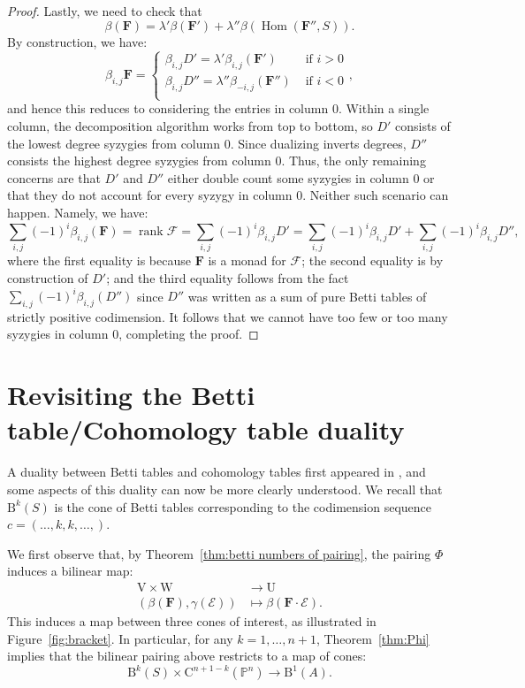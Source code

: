 \documentclass[12pt]{amsart}
\theoremstyle{definition}
\theoremstyle{remark}
\newcommand{\Hom}{\operatorname{Hom}} %
\newcommand{\rank}{\operatorname{rank}}
\newcommand{\PP}{\mathbb{P}}
\newcommand{\UU}{\mathrm{U}}
\newcommand{\VV}{\mathrm{V}}
\newcommand{\WW}{\mathrm{W}}
\newcommand{\bb}{c}
\newcommand{\cE}{\mathcal{E}}
\newcommand{\cF}{\mathcal{F}}
\newcommand{\FF}{\mathbf{F}}
\newcommand{\CQ}{\mathrm{C}}
\newcommand{\BBQ}{\mathrm{B}}
\begin{document}
\begin{proof}
Lastly, we need to check that
\[
\beta(\FF)=\lambda'\beta(\FF')+\lambda''\beta(\Hom(\FF'',S)).
\]
By construction, we have:
\[
\beta_{i,j}\FF=\begin{cases}
\beta_{i,j}D'=\lambda'\beta_{i,j}(\FF') &\text{ if } i>0\\
\beta_{i,j}D''=\lambda''\beta_{-i,j}(\FF'') &\text{ if } i<0\\
\end{cases},
\]
and hence this reduces to considering the entries in column $0$.  Within a single column, the decomposition algorithm works from top to bottom, so $D'$ consists of the lowest degree syzygies from column $0$.  Since dualizing inverts degrees, $D''$ consists the highest degree syzygies from column $0$.  Thus, the only remaining concerns are that $D'$ and $D''$ either double count some syzygies in column $0$ or that they do not account for every syzygy in column $0$.  Neither such scenario can happen.  Namely, we have:
\[
\sum_{i,j} (-1)^i \beta_{i,j}(\FF)=\rank \cF=\sum_{i,j} (-1)^i\beta_{i,j}D'=\sum_{i,j} (-1)^i\beta_{i,j}D'+\sum_{i,j} (-1)^i\beta_{i,j}D'',
\]
where the first equality is because $\FF$ is a monad for $\cF$; the second equality is by construction of $D'$; and the third equality follows from the fact $\sum_{i,j}(-1)^i\beta_{i,j}(D'')$ since $D''$ was written as a sum of pure Betti tables of strictly positive codimension.  It follows that we cannot have too few or too many syzygies in column $0$, completing the proof.
\end{proof}








\section{Revisiting the Betti table/Cohomology table duality}\label{sec:duality}
A duality between Betti tables and cohomology tables first appeared in \cite{eis-schrey1}, and some aspects of this duality
can now be more clearly understood. We recall that $\BBQ^k(S)$ is the cone of Betti tables corresponding to the codimension sequence $\bb=(\dots,k,k,\dots,)$.


 We first observe that, by Theorem~\ref{thm:betti numbers of pairing}, the pairing $\Phi$ induces a bilinear map:
\begin{align*}
\VV\times \WW & \to \UU\\
(\beta(\FF),\gamma(\cE))&\mapsto \beta(\FF\cdot \cE).
\end{align*}
This induces a map between three cones of interest, as illustrated in Figure~\ref{fig:bracket}.  In particular, for any $k=1, \dots, n+1$, Theorem~\ref{thm:Phi} implies that the bilinear pairing above restricts to a map of cones:
\[
\BBQ^{k}(S)\times \CQ^{n+1-k}(\PP^n)\to \BBQ^1(A).
\]
\end{document}
